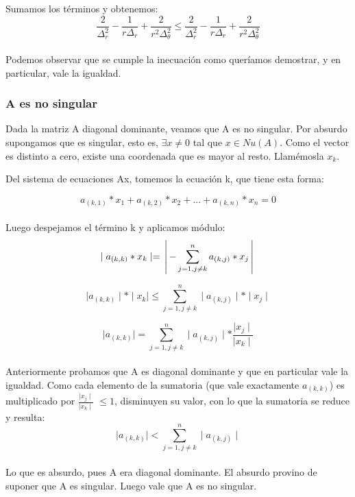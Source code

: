 Sumamos los términos y obtenemos: \\
$$\frac{2}{\Delta^2_r}-\frac{1}{r \Delta_r}+\frac{2}{r^2 \Delta^2_\theta} \leq \frac{2}{\Delta^2_r}-\frac{1}{r \Delta_r}+\frac{2}{r^2 \Delta^2_\theta}$$ \\
Podemos observar que se cumple la inecuación como queríamos demostrar, y en particular, vale la igualdad.



\subsubsection{A es no singular}
Dada la matriz A diagonal dominante, veamos que A es no singular.
Por absurdo supongamos que es singular, esto es, $\exists x\neq 0$ tal que $x \in Nu(A)$.
Como el vector es distinto a cero, existe una coordenada que es mayor al resto. Llamémosla $x_{k}$.


Del sistema de ecuaciones Ax, tomemos la ecuación k, que tiene esta forma:                  

$$ a_{(k, 1)} * x_{1} + a_{(k, 2)} * x_{2} +... + a_{(k, n)} * x_{n} = 0 $$\\

Luego despejamos el término k y aplicamos módulo:\\

 $$ \mid a_{(k, k)} * x_{k} \mid  =  \left \arrowvert - \sum_{j=1,j\neq k}^{n}  a_{(k,j)} * x_{j} \right \arrowvert $$

 $$ \mid a_{(k, k)}\mid * \mid x_{k} \mid \leq \sum_{j=1,j\neq k}^{n} \mid a_{(k,j)}\mid * \mid x_{j} \mid $$


 $$ \mid a_{(k, k)}\mid  = \sum_{j=1,j\neq k}^{n} \mid a_{(k,j)}\mid *  \frac{\mid x_{j} \mid}{\mid x_{k} \mid}$$\\

Anteriormente probamos que A es diagonal dominante y que en particular vale la igualdad. Como cada elemento de la sumatoria (que vale exactamente $a_{(k, k)}$) es multiplicado por $\frac{\mid x_{j} \mid}{\mid x_{k} \mid}$ $\leq 1$, disminuyen su valor, con lo que la sumatoria se reduce y resulta:\\

$$\mid a_{(k,k)} \mid < \sum_{j=1, j\neq k}^{n}\mid a_{(k,j)} \mid $$\\

Lo que es absurdo, pues A era diagonal dominante. El absurdo provino de suponer que A es singular. Luego vale que A es no singular.




